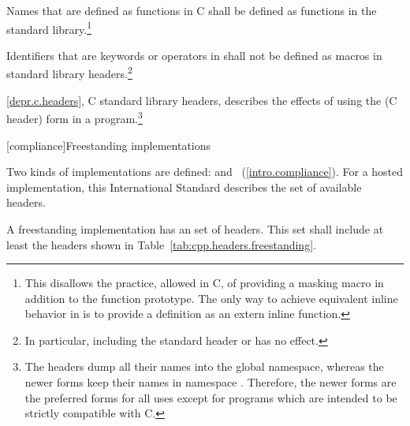 \pnum
Names that are defined as functions in C shall be defined as functions in the
\Cpp standard library.\footnote{This disallows the practice, allowed in C, of
providing a masking macro in addition to the function prototype. The only way to
achieve equivalent inline behavior in \Cpp is to provide a definition as an
extern inline function.}

\pnum
Identifiers that are keywords or operators in \Cpp shall not be defined as
macros in \Cpp standard library headers.\footnote{In particular, including the
standard header  or  has no effect.}

\pnum
\ref{depr.c.headers}, C standard library headers, describes the effects of using
the  (C header) form in a \Cpp program.\footnote{ The
 headers dump all their names into the global namespace, whereas the
newer forms keep their names in namespace . Therefore, the newer
forms are the preferred forms for all uses except for \Cpp programs which are
intended to be strictly compatible with C. }

[compliance]{Freestanding implementations}

\pnum
Two kinds of implementations are defined:
and
~(\ref{intro.compliance}).
For a hosted implementation, this International Standard
%
describes the set of available headers.

\pnum
A freestanding implementation has an
 set of headers. This set shall
include at least the headers shown in Table~\ref{tab:cpp.headers.freestanding}.

